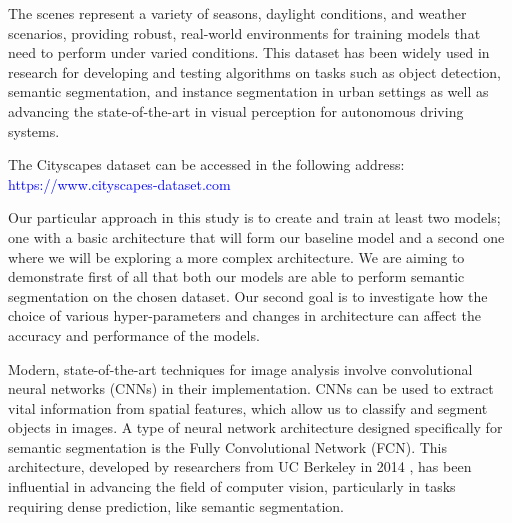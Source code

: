 \documentclass[a4paper,11pt]{article}
\begin{document}
The scenes represent a variety of seasons, daylight conditions, and weather scenarios, providing robust, real-world environments for training models that need to perform under varied conditions. This dataset has been widely used in research for developing and testing algorithms on tasks such as object detection, semantic segmentation, and instance segmentation in urban settings as well as advancing the state-of-the-art in visual perception for autonomous driving systems. 

The Cityscapes dataset can be accessed in the following address:\\ 
{\centering 
\textcolor{blue} {https://www.cityscapes-dataset.com}\\
}

Our particular approach in this study is to create and train at least two models; one with a basic architecture that will form our baseline model and a second one where we will be exploring a more complex architecture. We are aiming to demonstrate first of all that both our models are able to perform semantic segmentation on the chosen dataset. Our second goal is to investigate how the choice of various hyper-parameters and changes in architecture can affect the accuracy and performance of the models. 

Modern, state-of-the-art techniques for image analysis involve convolutional neural networks (CNNs) in their implementation. CNNs can be used to extract vital information from spatial features, which allow us to classify and segment objects in images. A type of neural network architecture designed specifically for semantic segmentation is the Fully Convolutional Network (FCN). This architecture, developed by researchers from UC Berkeley in 2014 \cite{DBLP:journals/corr/LongSD14}, has been influential in advancing the field of computer vision, particularly in tasks requiring dense prediction, like semantic segmentation. 
\end{document}
